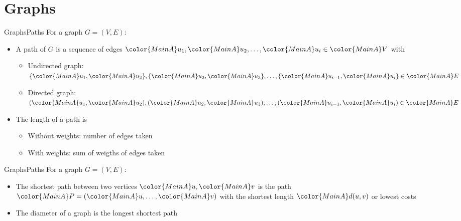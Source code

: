 \section{Graphs}

\begin{frame}{Graphs}{Paths}
  For a graph {\color{MainA}$G = (V, E)$}:
  \begin{itemize}
    \item
      A path of {\color{MainA}$G$} is a sequence of edges
      \begin{math}
        {\color{MainA}u_1},
        {\color{MainA}u_2},
        \dots,
        {\color{MainA}u_i} \in {\color{MainA}V}
      \end{math}
      with
      \begin{itemize}
        \item
          Undirected graph:
          \begin{math}
            \{{\color{MainA}u_1}, {\color{MainA}u_2}\},
            \{{\color{MainA}u_2}, {\color{MainA}u_3}\},
            \dots,
            \{{\color{MainA}u_{i-1}}, {\color{MainA}u_i}\} \in
            {\color{MainA}E}
          \end{math}
        \item
          Directed graph:
          \begin{math}
            ({\color{MainA}u_1}, {\color{MainA}u_2}),
            ({\color{MainA}u_2}, {\color{MainA}u_3}),
            \dots,
            ({\color{MainA}u_{i-1}}, {\color{MainA}u_i}) \in
            {\color{MainA}E}
          \end{math}
      \end{itemize}
    \item
      The {\color{MainA}length of a path} is
      \begin{itemize}
        \item
          Without weights:
          {\color{MainA}number of edges} taken
        \item
          With weights:
          {\color{MainA}sum of weigths of edges} taken
      \end{itemize}
  \end{itemize}
\end{frame}


\begin{frame}{Graphs}{Paths}
  For a graph {\color{MainA}$G = (V, E)$}:
  \begin{itemize}
    \item
      The {\color{MainA}shortest path} between two vertices
      ${\color{MainA}u}, {\color{MainA}v}$ is the path
      \begin{math}
      {\color{MainA}P}
      = ({\color{MainA}u}, \dots, {\color{MainA}v})
      \end{math}
      with the shortest length ${\color{MainA}d(u,v)}$ or lowest costs
    \item
      The {\color{MainA}diameter} of a graph is the
      {\color{MainA}longest shortest path}
  \end{itemize}
\end{frame}
